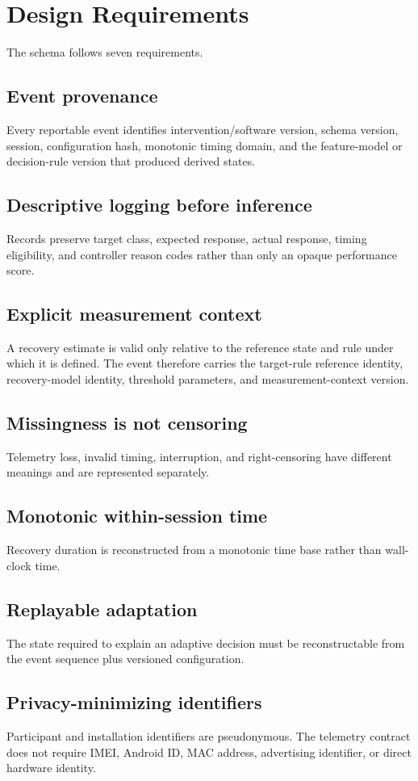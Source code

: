 \section{Design Requirements}

The schema follows seven requirements.

\subsection{Event provenance}
Every reportable event identifies intervention/software version, schema version, session, configuration hash, monotonic timing domain, and the feature-model or decision-rule version that produced derived states.

\subsection{Descriptive logging before inference}
Records preserve target class, expected response, actual response, timing eligibility, and controller reason codes rather than only an opaque performance score.

\subsection{Explicit measurement context}
A recovery estimate is valid only relative to the reference state and rule under which it is defined. The event therefore carries the target-rule reference identity, recovery-model identity, threshold parameters, and measurement-context version.

\subsection{Missingness is not censoring}
Telemetry loss, invalid timing, interruption, and right-censoring have different meanings and are represented separately.

\subsection{Monotonic within-session time}
Recovery duration is reconstructed from a monotonic time base rather than wall-clock time.

\subsection{Replayable adaptation}
The state required to explain an adaptive decision must be reconstructable from the event sequence plus versioned configuration.

\subsection{Privacy-minimizing identifiers}
Participant and installation identifiers are pseudonymous. The telemetry contract does not require IMEI, Android ID, MAC address, advertising identifier, or direct hardware identity.
